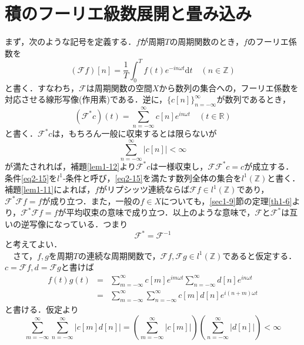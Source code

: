 \documentclass[a4j]{jsbook}
\numberwithin{theorem}{chapter}  %
\begin{document}
\section{積のフーリエ級数展開と畳み込み} \label{sec2-4}
まず，次のような記号を定義する．\(f\)が周期\(T\)の周期関数のとき，\(f\)のフーリエ係数を
\begin{equation*}
    (\mathcal{F}f)[n]=\frac{1}{T}\int_0^T f(t)e^{-in\omega t}\mathrm{d}t\quad (n\in\mathbb{Z})
\end{equation*}
と書く．すなわち，\(\mathcal{F}\)は周期関数の空間\(X\)から数列の集合への，フーリエ係数を対応させる線形写像(作用素)である．逆に，\(\{c[n]\}_{n=-\infty}^\infty\)が数列であるとき，
\begin{equation*}
    (\mathcal{F}^* c)(t)=\sum_{n=-\infty}^\infty c[n]e^{in\omega t}\quad (t\in\mathbb{R})
\end{equation*}
と書く．\(\mathcal{F}^* c\)は，もちろん一般に収束するとは限らないが
\begin{equation}
    \sum_{n=-\infty}^\infty |c[n]|<\infty \label{eq2-15}
\end{equation}
が満たされれば，補題\ref{lem1-12}より\(\mathcal{F}^* c\)は一様収束し，\(\mathcal{F}\mathcal{F}^* c=c\)が成立する．条件\eqref{eq2-15}を\(l^1\)-条件と呼び，\eqref{eq2-15}を満たす数列全体の集合を\(l^1(\mathbb{Z})\)と書く．補題\ref{lem1-11}によれば，\(f\)がリプシッツ連続ならば\(\mathcal{F}f\in l^1(\mathbb{Z})\)であり，\(\mathcal{F}^*\mathcal{F}f=f\)が成り立つ．また，一般の\(f\in X\)についても，\ref{sec1-9}節の定理\ref{th1-6}より，\(\mathcal{F}^*\mathcal{F}f=f\)が平均収束の意味で成り立つ．以上のような意味で，\(\mathcal{F}\)と\(\mathcal{F}^*\)は互いの逆写像になっている．つまり
\begin{equation*}
    \mathcal{F}^*=\mathcal{F}^{-1}
\end{equation*}
と考えてよい．\\
　さて，\(f, g\)を周期\(T\)の連続な周期関数で，\(\mathcal{F}f, \mathcal{F}g\in l^1(\mathbb{Z})\)であると仮定する．\(c=\mathcal{F}f, d=\mathcal{F}g\)と書けば
\begin{eqnarray*}
f(t)g(t)&=&\sum_{m=-\infty}^\infty c[m]e^{im\omega t}\sum_{n=-\infty}^\infty d[n]e^{in\omega t} \\
&=&\sum_{m=-\infty}^\infty\sum_{n=-\infty}^\infty c[m]d[n]e^{i(n+m)\omega t}
\end{eqnarray*}
と書ける．仮定より
\begin{equation*}
    \sum_{m=-\infty}^\infty\sum_{n=-\infty}^\infty|c[m]d[n]|=\left(\sum_{m=-\infty}^\infty |c[m]|\right)\left(\sum_{n=-\infty}^\infty |d[n]|\right)<\infty
\end{equation*}
\end{document}
